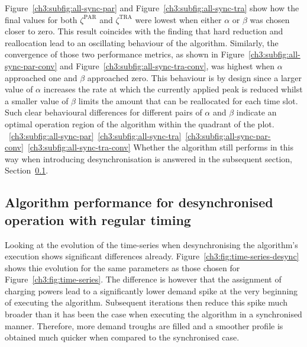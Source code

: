 Figure~\ref{ch3:subfig:all-sync-par} and Figure~\ref{ch3:subfig:all-sync-tra} show how the final values for both $\zeta^\text{PAR}$ and $\zeta^\text{TRA}$ were lowest when either $\alpha$ or $\beta$ was chosen closer to zero.
This result coincides with the finding that hard reduction and reallocation lead to an oscillating behaviour of the algorithm.
Similarly, the convergence of those two performance metrics, as shown in Figure~\ref{ch3:subfig:all-sync-par-conv} and Figure~\ref{ch3:subfig:all-sync-tra-conv}, was highest when $\alpha$ approached one and $\beta$ approached zero.
This behaviour is by design since a larger value of $\alpha$ increases the rate at which the currently applied peak is reduced whilst a smaller value of $\beta$ limits the amount that can be reallocated for each time slot.
Such clear behavioural differences for different pairs of $\alpha$ and $\beta$ indicate an optimal operation region of the algorithm within the  quadrant of the plot.
~\ref{ch3:subfig:all-sync-par}~\ref{ch3:subfig:all-sync-tra}~\ref{ch3:subfig:all-sync-par-conv}~\ref{ch3:subfig:all-sync-tra-conv}
Whether the algorithm still performs in this way when introducing desynchronisation is answered in the subsequent section, Section~\ref{ch3:subsec:algorithm-performance-desynchronised-regular}.


\subsection{Algorithm performance for desynchronised operation with regular timing}
\label{ch3:subsec:algorithm-performance-desynchronised-regular}



Looking at the evolution of the time-series when desynchronising the algorithm's execution shows significant differences already.
Figure~\ref{ch3:fig:time-series-desync} shows thie evolution for the same parameters as those chosen for Figure~\ref{ch3:fig:time-series}.
The difference is however that the assignment of charging powers lead to a significantly lower demand spike at the very beginning of executing the algorithm.
Subsequent iterations then reduce this spike much broader than it has been the case when executing the algorithm in a synchronised manner.
Therefore, more demand troughs are filled and a smoother profile is obtained much quicker\hladd{,} when compared to the synchronised case.

